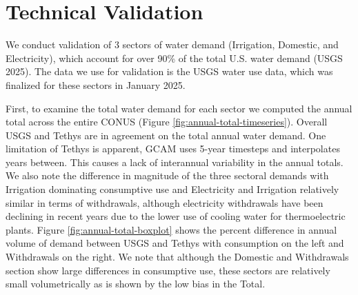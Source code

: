 \documentclass[fleqn,10pt]{wlscirep}
\begin{document}

\section*{Technical Validation}

We conduct validation of 3 sectors of water demand (Irrigation, Domestic, and Electricity), which account for over 90\% of the total U.S. water demand (USGS 2025). The data we use for validation is the USGS water use data, which was finalized for these sectors in January 2025. 

First, to examine the total water demand for each sector we computed the annual total across the entire CONUS (Figure \ref{fig:annual-total-timeseries}). Overall USGS and Tethys are in agreement on the total annual water demand. One limitation of Tethys is apparent, GCAM uses 5-year timesteps and interpolates years between. This causes a lack of interannual variability in the annual totals. We also note the difference in magnitude of the three sectoral demands with Irrigation dominating consumptive use and Electricity and Irrigation relatively similar in terms of withdrawals, although electricity withdrawals have been declining in recent years due to the lower use of cooling water for thermoelectric plants\cite{skinnerWaterWithdrawalConsumption2025}. Figure \ref{fig:annual-total-boxplot} shows the percent difference in annual volume of demand between USGS and Tethys with consumption on the left and Withdrawals on the right. We note that although the Domestic and Withdrawals section show large differences in consumptive use, these sectors are relatively small volumetrically as is shown by the low bias in the Total. 





\end{document}
